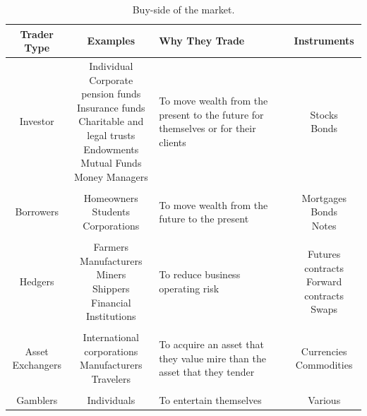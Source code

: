 \documentclass[../TGMAFFIRO]{subfiles}
\begin{document}
\begin{table}[!h]
	\centering
	\begin{tabular}{ c c m{3cm} c}
		\hline
		Trader Type & Examples & Why They Trade & Instruments\\
		\hline
		Investor & \breakcell{Individual \\ Corporate pension funds \\ Insurance funds \\ Charitable and legal trusts \\ Endowments \\ Mutual Funds \\ Money Managers} & {To move wealth from the present to the future for themselves or for their clients} & \breakcell{Stocks \\ Bonds} \\
		\\
		Borrowers & \breakcell{Homeowners \\ Students \\ Corporations} & {To move wealth from the future to the present} & \breakcell{Mortgages \\ Bonds \\ Notes}\\
		\\
		Hedgers & \breakcell{Farmers \\ Manufacturers \\ Miners \\ Shippers \\ Financial Institutions} & {To reduce business operating risk} & \breakcell{Futures contracts \\ Forward contracts \\ Swaps}\\
		\\
		\breakcell{Asset \\ Exchangers} & \breakcell{International corporations \\ Manufacturers \\ Travelers} & {To acquire an asset that they value mire than the asset that they tender} & \breakcell{Currencies \\ Commodities} \\
		\\
		Gamblers & Individuals & {To entertain themselves} & Various\\
		\hline
	\end{tabular}
	\caption{Buy-side of the market. }
\end{table}
\end{document}
